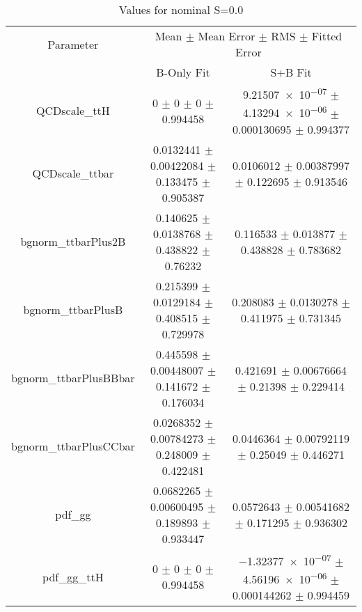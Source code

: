 \begin{table}
\centering
\caption{Values for nominal S=0.0}
\begin{tabular}{ccc}
\toprule
Parameter & \multicolumn{2}{c}{Mean $\pm$ Mean Error $\pm$ RMS $\pm$ Fitted Error}\\
 & B-Only Fit & S+B Fit\\
\midrule
QCDscale\_ttH & \num{0} $\pm$ \num{0} $\pm$ \num{0} $\pm$ \num{0.994458} & \num{9.21507e-07} $\pm$ \num{4.13294e-06} $\pm$ \num{0.000130695} $\pm$ \num{0.994377}\\
QCDscale\_ttbar & \num{0.0132441} $\pm$ \num{0.00422084} $\pm$ \num{0.133475} $\pm$ \num{0.905387} & \num{0.0106012} $\pm$ \num{0.00387997} $\pm$ \num{0.122695} $\pm$ \num{0.913546}\\
bgnorm\_ttbarPlus2B & \num{0.140625} $\pm$ \num{0.0138768} $\pm$ \num{0.438822} $\pm$ \num{0.76232} & \num{0.116533} $\pm$ \num{0.013877} $\pm$ \num{0.438828} $\pm$ \num{0.783682}\\
bgnorm\_ttbarPlusB & \num{0.215399} $\pm$ \num{0.0129184} $\pm$ \num{0.408515} $\pm$ \num{0.729978} & \num{0.208083} $\pm$ \num{0.0130278} $\pm$ \num{0.411975} $\pm$ \num{0.731345}\\
bgnorm\_ttbarPlusBBbar & \num{0.445598} $\pm$ \num{0.00448007} $\pm$ \num{0.141672} $\pm$ \num{0.176034} & \num{0.421691} $\pm$ \num{0.00676664} $\pm$ \num{0.21398} $\pm$ \num{0.229414}\\
bgnorm\_ttbarPlusCCbar & \num{0.0268352} $\pm$ \num{0.00784273} $\pm$ \num{0.248009} $\pm$ \num{0.422481} & \num{0.0446364} $\pm$ \num{0.00792119} $\pm$ \num{0.25049} $\pm$ \num{0.446271}\\
pdf\_gg & \num{0.0682265} $\pm$ \num{0.00600495} $\pm$ \num{0.189893} $\pm$ \num{0.933447} & \num{0.0572643} $\pm$ \num{0.00541682} $\pm$ \num{0.171295} $\pm$ \num{0.936302}\\
pdf\_gg\_ttH & \num{0} $\pm$ \num{0} $\pm$ \num{0} $\pm$ \num{0.994458} & \num{-1.32377e-07} $\pm$ \num{4.56196e-06} $\pm$ \num{0.000144262} $\pm$ \num{0.994459}\\
\bottomrule
\end{tabular}
\end{table}